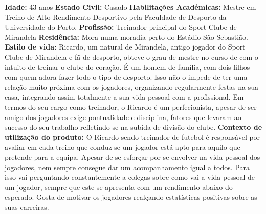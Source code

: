 \noindent\textbf{Idade:} 43 anos
\newline\textbf{Estado Civil:} Casado
\newline\textbf{Habilitações Académicas:} Mestre em Treino de Alto Rendimento Desportivo pela Faculdade de Desporto da Universidade do Porto.
\newline\textbf{Profissão:} Treinador principal do Sport Clube de Mirandela
\newline\textbf{Residência:} Mora numa moradia perto do Estádio São Sebastião.
\vspace{3mm}
\newline\textbf{Estilo de vida:} Ricardo, um natural de Mirandela, antigo jogador do Sport Clube de Mirandela e fã de desporto, obteve o grau de mestre no curso de com o intuito de treinar o clube do coração. É um homem de família, com dois filhos com quem adora fazer todo o tipo de desporto. Isso não o impede de ter uma relação muito próxima com os jogadores, organizando regularmente festas na sua casa, integrando assim totalmente a sua vida pessoal com a profissional. Em termos do seu cargo como treinador, o Ricardo é um perfecionista, apesar de ser amigo dos jogadores exige pontualidade e disciplina, fatores que levaram ao sucesso do seu trabalho refletindo-se na subida de divisão do clube.
\vspace{3mm}
\newline\textbf{Contexto de utilização do produto:} O Ricardo sendo treinador de futebol é responsável por avaliar em cada treino que conduz se um jogador está apto para aquilo que pretende para a equipa. Apesar de se esforçar por se envolver na vida pessoal dos jogadores, nem sempre consegue dar um acompanhamento igual a todos. Para isso vai perguntando constantemente a colegas sobre como vai a vida pessoal de um jogador, sempre que este se apresenta com um rendimento abaixo do esperado. Gosta de motivar os jogadores realçando estatísticas positivas sobre as suas carreiras.
\vspace{3mm}


